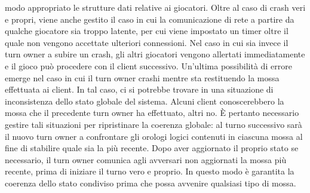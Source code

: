 modo appropriato le strutture dati relative ai giocatori. Oltre al caso di crash 
veri e propri, viene anche gestito il caso in cui la comunicazione di rete a 
partire da qualche giocatore sia troppo latente, per cui viene impostato un 
timer oltre il quale non vengono accettate ulteriori connessioni.
Nel caso in cui sia invece il turn owner a subire un crash, gli altri giocatori 
vengono allertati immediatamente e il gioco può procedere con il client 
successivo.
Un'ultima possibilità di errore emerge nel caso in cui il turn owner crashi 
mentre sta restituendo la mossa effettuata ai client. In tal caso, ci 
si potrebbe trovare in una situazione di inconsistenza dello stato globale del 
sistema. Alcuni client conoscerebbero la mossa che il precedente turn owner ha 
effettuato, altri no. È pertanto necessario gestire tali situazioni per 
ripristinare la coerenza globale: al turno successivo sarà il nuovo turn owner 
a confrontare gli orologi logici contenuti in ciascuna mossa al fine di 
stabilire quale sia la più recente. Dopo aver aggiornato il proprio stato se 
necessario, il turn owner comunica agli avversari non aggiornati la mossa più 
recente, prima di iniziare il turno vero e proprio. In questo modo è garantita 
la coerenza dello stato condiviso prima che possa avvenire qualsiasi tipo di 
mossa.
